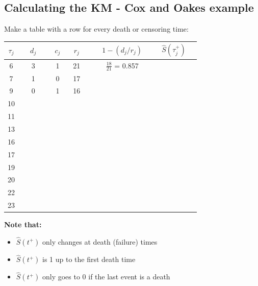 \documentclass[11pt,slidesonly,semrot,portrait,palatino]{book}
\begin{document}
\subsection{Calculating the KM - Cox and Oakes example}
Make  a table with a row for every  death or censoring time:
\begin{center}
\begin{tabular}{ccccccc}
$\tau_j$ & ~~$d_j$~~   & $~~c_j~~$  & $~~r_j~~$ & ~~~$1-(d_j/r_j)$~~~
& $\hat{S}(\tau_j^+ )$ \\  \hline
6  &  3     &  1      &  21     & $\frac{18}{21}$ = 0.857 \\
7  &  1     &  0      &  17     & \\
9  &  0     &  1      &  16     & \\
10 \\
11 \\
13 \\
16 \\
17 \\
19 \\
20 \\
22 \\
23 \\
\end{tabular}
\end{center}
{\bf Note that:}
 \begin{itemize}
 \item $\hat{S}(t^+)$ only changes at death (failure) times
 \item $\hat{S}(t^+)$ is 1 up to the first death time
 \item $\hat{S}(t^+)$ only goes to 0 if the last event is a death
 \end{itemize}
\normalsize
\end{document}

